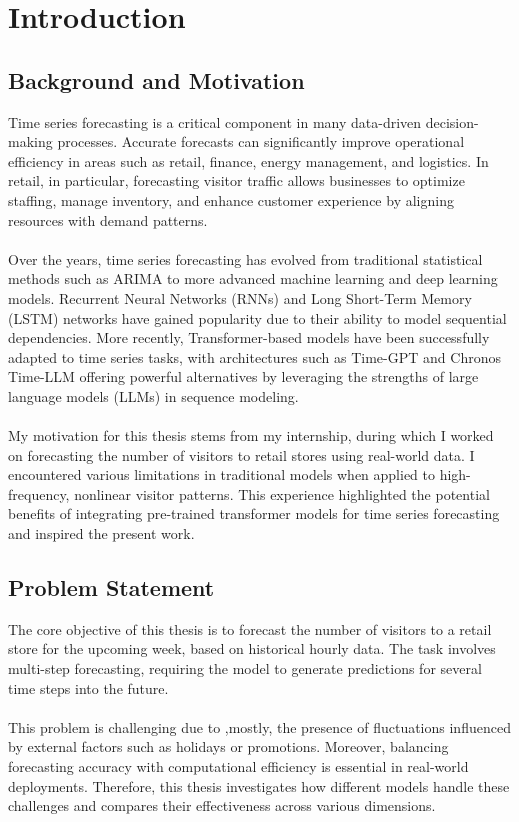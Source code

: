 \documentclass{article}
\begin{document}
\section{Introduction}
\subsection{Background and Motivation}
Time series forecasting is a critical component in many data-driven decision-making processes. Accurate forecasts can significantly improve operational efficiency in areas such as retail, finance, energy management, and logistics. In retail, in particular, forecasting visitor traffic allows businesses to optimize staffing, manage inventory, and enhance customer experience by aligning resources with demand patterns.\\
\\
Over the years, time series forecasting has evolved from traditional statistical methods such as ARIMA to more advanced machine learning and deep learning models. Recurrent Neural Networks (RNNs) and Long Short-Term Memory (LSTM) networks have gained popularity due to their ability to model sequential dependencies. More recently, Transformer-based models have been successfully adapted to time series tasks, with architectures such as Time-GPT and Chronos Time-LLM offering powerful alternatives by leveraging the strengths of large language models (LLMs) in sequence modeling.\\
\\
My motivation for this thesis stems from my internship, during which I worked on forecasting the number of visitors to retail stores using real-world data. I encountered various limitations in traditional models when applied to high-frequency, nonlinear visitor patterns. This experience highlighted the potential benefits of integrating pre-trained transformer models for time series forecasting and inspired the present work.

\subsection{Problem Statement}
The core objective of this thesis is to forecast the number of visitors to a retail store for the upcoming week, based on historical hourly data. The task involves multi-step forecasting, requiring the model to generate predictions for several time steps into the future.\\
\\
This problem is challenging due to ,mostly, the presence of fluctuations influenced by external factors such as holidays or promotions. Moreover, balancing forecasting accuracy with computational efficiency is essential in real-world deployments. Therefore, this thesis investigates how different models handle these challenges and compares their effectiveness across various dimensions.
\end{document}
